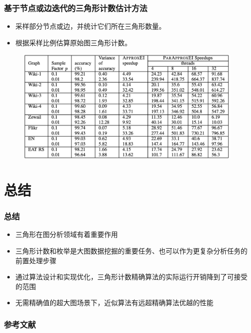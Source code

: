\documentclass{beamer}
\begin{document}
\begin{frame}
\frametitle{基于节点或边迭代的三角形计数估计方法\cite{rahman2013approximate}} 

\begin{itemize}
    \item 采样部分节点或边，并统计它们所在三角形数量。
    \item 根据采样比例估算原始图三角形计数。
\end{itemize}

\begin{figure}[H]
    \includegraphics[width=\textwidth]{Img/tb.png}
\end{figure}
\end{frame}

\section{总结}
\begin{frame}
\frametitle{总结} 
\begin{itemize}
\item 三角形在图分析领域有着重要作用\\
\item 三角形计数和枚举是大图数据挖掘的重要任务、也可以作为更复杂分析任务的前置处理步骤\\
\item 通过算法设计和实现优化，三角形计数精确算法的实际运行开销降到了可接受的范围\\
\item 无需精确值的超大图场景下，近似算法有远超精确算法优越的性能\\
\end{itemize}
\end{frame}

\begin{frame}[allowframebreaks] 
\frametitle{参考文献}
    \printbibliography
\end{frame}
\end{document}
